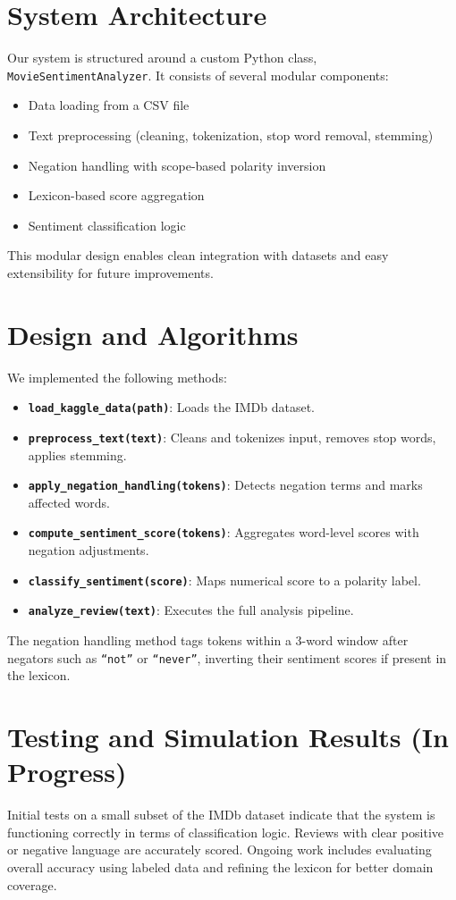 \documentclass[conference]{IEEEtran}
\begin{document}
	\section{System Architecture}
	Our system is structured around a custom Python class, \texttt{MovieSentimentAnalyzer}. It consists of several modular components:
	\begin{itemize}
		\item Data loading from a CSV file
		\item Text preprocessing (cleaning, tokenization, stop word removal, stemming)
		\item Negation handling with scope-based polarity inversion
		\item Lexicon-based score aggregation
		\item Sentiment classification logic
	\end{itemize}
	This modular design enables clean integration with datasets and easy extensibility for future improvements.
	
	\section{Design and Algorithms}
	We implemented the following methods:
	\begin{itemize}
		\item \textbf{\texttt{load\_kaggle\_data(path)}}: Loads the IMDb dataset.
		\item \textbf{\texttt{preprocess\_text(text)}}: Cleans and tokenizes input, removes stop words, applies stemming.
		\item \textbf{\texttt{apply\_negation\_handling(tokens)}}: Detects negation terms and marks affected words.
		\item \textbf{\texttt{compute\_sentiment\_score(tokens)}}: Aggregates word-level scores with negation adjustments.
		\item \textbf{\texttt{classify\_sentiment(score)}}: Maps numerical score to a polarity label.
		\item \textbf{\texttt{analyze\_review(text)}}: Executes the full analysis pipeline.
	\end{itemize}
	The negation handling method tags tokens within a 3-word window after negators such as \texttt{``not''} or \texttt{``never''}, inverting their sentiment scores if present in the lexicon.
	
	\section{Testing and Simulation Results (In Progress)}
	Initial tests on a small subset of the IMDb dataset indicate that the system is functioning correctly in terms of classification logic. Reviews with clear positive or negative language are accurately scored. Ongoing work includes evaluating overall accuracy using labeled data and refining the lexicon for better domain coverage.
	
\end{document}
